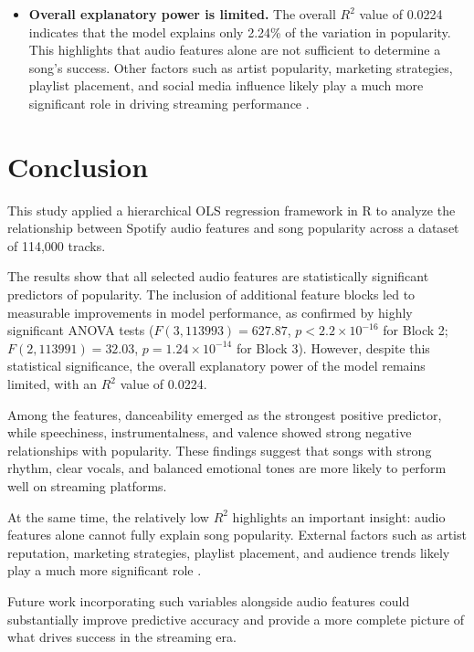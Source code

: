 \documentclass[12pt,a4paper]{article}
\begin{document}
\begin{itemize}
  \item \textbf{Overall explanatory power is limited.}
        The overall $R^2$ value of 0.0224 indicates that the model explains
        only 2.24\% of the variation in popularity. This highlights that
        audio features alone are not sufficient to determine a song's
        success. Other factors such as artist popularity, marketing
        strategies, playlist placement, and social media influence likely
        play a much more significant role in driving streaming performance
        \citep{interiano2018}.

\end{itemize}

\section{Conclusion}

This study applied a hierarchical OLS regression framework in R to
analyze the relationship between Spotify audio features and song
popularity across a dataset of 114{,}000 tracks.

The results show that all selected audio features are statistically
significant predictors of popularity. The inclusion of additional
feature blocks led to measurable improvements in model performance,
as confirmed by highly significant ANOVA tests
($F(3, 113993) = 627.87$, $p < 2.2 \times 10^{-16}$ for Block 2;
$F(2, 113991) = 32.03$, $p = 1.24 \times 10^{-14}$ for Block 3). However, despite
this statistical significance, the overall explanatory power of the
model remains limited, with an $R^2$ value of 0.0224.

Among the features, danceability emerged as the strongest positive
predictor, while speechiness, instrumentalness, and valence showed
strong negative relationships with popularity. These findings suggest
that songs with strong rhythm, clear vocals, and balanced emotional
tones are more likely to perform well on streaming platforms.

At the same time, the relatively low $R^2$ highlights an important
insight: audio features alone cannot fully explain song popularity.
External factors such as artist reputation, marketing strategies,
playlist placement, and audience trends likely play a much more
significant role \citep{interiano2018}.

Future work incorporating such variables alongside audio features 
could substantially improve predictive accuracy and provide a 
more complete picture of what drives success in the streaming era.
\end{document}
